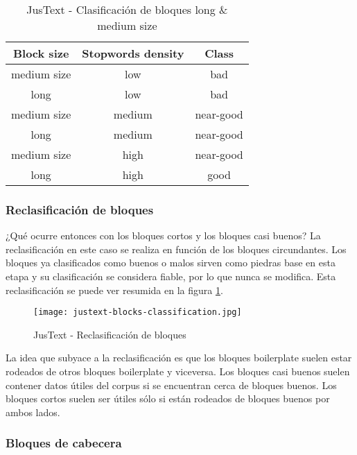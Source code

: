 \begin{table}[h]
  \begin{center}
  \begin{tabular}{| c | c | c |}
  \hline \textbf{Block size} & \textbf{Stopwords density} & \textbf{Class} \\ \hline
  medium size & low & bad \\ \hline
  long & low & bad \\ \hline
  medium size & medium & near-good \\ \hline
  long & medium & near-good \\ \hline
  medium size & high & near-good \\ \hline
  long & high & good \\ \hline
  \end{tabular}
  \caption{JusText - Clasificación de bloques long \& medium size}
  \label{tab:justext - clasificacion de bloques long & medium size}
  \end{center}
\end{table}

\subsubsection{Reclasificación de bloques}
\label{subsubsec:reclasificacion de bloques}

¿Qué ocurre entonces con los bloques cortos y los bloques casi buenos? La reclasificación en este caso se 
realiza en función de los bloques circundantes. Los bloques ya clasificados como buenos o malos sirven 
como piedras base en esta etapa y su clasificación se considera fiable, por lo que nunca se modifica. Esta 
reclasificación se puede ver resumida en la figura \ref{img:justext - reclasificacion de bloques}.

\begin{figure}[tphb]
  \centering
  \texttt{[image: justext-blocks-classification.jpg]}
  \caption{JusText - Reclasificación de bloques}
  \label{img:justext - reclasificacion de bloques}
\end{figure}

La idea que subyace a la reclasificación es que los bloques boilerplate suelen estar rodeados de otros 
bloques boilerplate y viceversa. Los bloques casi buenos suelen contener datos útiles del corpus si se 
encuentran cerca de bloques buenos. Los bloques cortos suelen ser útiles sólo si están rodeados de bloques 
buenos por ambos lados.

\subsubsection{Bloques de cabecera}
\label{subsubsec:bloques de cabecera}

